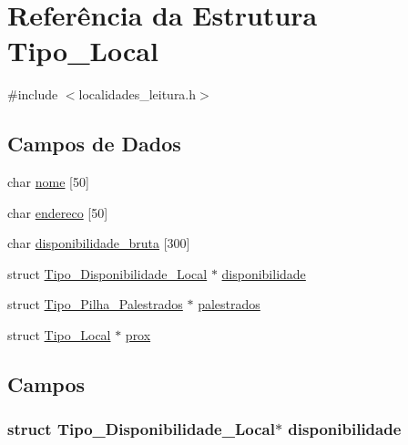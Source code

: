 \hypertarget{struct_tipo___local}{}\section{Referência da Estrutura Tipo\+\_\+\+Local}
\label{struct_tipo___local}


{\ttfamily \#include $<$localidades\+\_\+leitura.\+h$>$}

\subsection*{Campos de Dados}
\begin{DoxyCompactItemize}
\item 
char \hyperlink{struct_tipo___local_ad9b32a94f9054fd81f59b1118b8d53d2}{nome} \mbox{[}50\mbox{]}
\item 
char \hyperlink{struct_tipo___local_a16f3ac8554441c8caab646a362ad2e35}{endereco} \mbox{[}50\mbox{]}
\item 
char \hyperlink{struct_tipo___local_a683bf37aaa0892f657c2263c1a4bdd92}{disponibilidade\+\_\+bruta} \mbox{[}300\mbox{]}
\item 
struct \hyperlink{struct_tipo___disponibilidade___local}{Tipo\+\_\+\+Disponibilidade\+\_\+\+Local} $\ast$ \hyperlink{struct_tipo___local_a4bd687741089a5762f6c5ac6f190dfa9}{disponibilidade}
\item 
struct \hyperlink{struct_tipo___pilha___palestrados}{Tipo\+\_\+\+Pilha\+\_\+\+Palestrados} $\ast$ \hyperlink{struct_tipo___local_af16c36ea00f86c3b5c4975856989af1f}{palestrados}
\item 
struct \hyperlink{struct_tipo___local}{Tipo\+\_\+\+Local} $\ast$ \hyperlink{struct_tipo___local_af88870599f755b0ce0fff7e6e72c167f}{prox}
\end{DoxyCompactItemize}


\subsection{Campos}
\hypertarget{struct_tipo___local_a4bd687741089a5762f6c5ac6f190dfa9}{}
\subsubsection[{disponibilidade}]{\setlength{\rightskip}{0pt plus 5cm}struct {\bf Tipo\+\_\+\+Disponibilidade\+\_\+\+Local}$\ast$ disponibilidade}\label{struct_tipo___local_a4bd687741089a5762f6c5ac6f190dfa9}
\hypertarget{struct_tipo___local_a683bf37aaa0892f657c2263c1a4bdd92}{}
